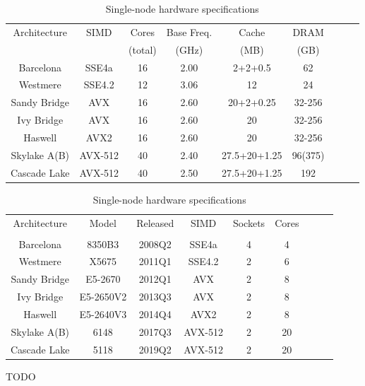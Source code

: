 \documentclass[]             %
{NASA}                       %
\begin{document}
\begin{table}[ht]%
\caption{Single-node hardware specifications}
\begin{tabular}{ccccccccc}
\toprule
Architecture & SIMD & Cores & Base Freq. & Cache & DRAM\\
& & (total)  & (GHz) & (MB) & (GB)\\
\midrule
Barcelona &  SSE4a & 16 & 2.00 & 2+2+0.5 & 62\\
Westmere &  SSE4.2 & 12 & 3.06 & 12 & 24\\
Sandy Bridge & AVX & 16 & 2.60 & 20+2+0.25 & 32-256\\
Ivy Bridge & AVX & 16 & 2.60 & 20 & 32-256\\
Haswell  & AVX2 & 16 & 2.60 & 20 & 32-256\\
Skylake A(B) &  AVX-512 & 40 & 2.40 & 27.5+20+1.25 & 96(375)\\
Cascade Lake &  AVX-512 & 40 & 2.50 & 27.5+20+1.25 & 192\\
\bottomrule
\end{tabular}
\end{table}

\begin{table}[ht]%
\caption{Single-node hardware specifications}
\begin{tabular}{ccccccccc}
\toprule
Architecture & Model & Released & SIMD & Sockets & Cores \\
& & & & & \\
\midrule
Barcelona & 8350B3 & 2008Q2 & SSE4a & 4 & 4\\
Westmere & X5675 & 2011Q1 & SSE4.2 & 2 & 6 \\
Sandy Bridge & E5-2670 & 2012Q1 & AVX & 2 & 8 \\
Ivy Bridge & E5-2650V2 & 2013Q3 & AVX & 2 & 8 \\
Haswell & E5-2640V3 & 2014Q4 & AVX2 & 2 & 8 \\
Skylake A(B) & 6148 & 2017Q3 & AVX-512 & 2 & 20\\
Cascade Lake & 5118 & 2019Q2 & AVX-512 & 2 & 20\\
\bottomrule
\end{tabular}
\end{table}
TODO
\end{document}
